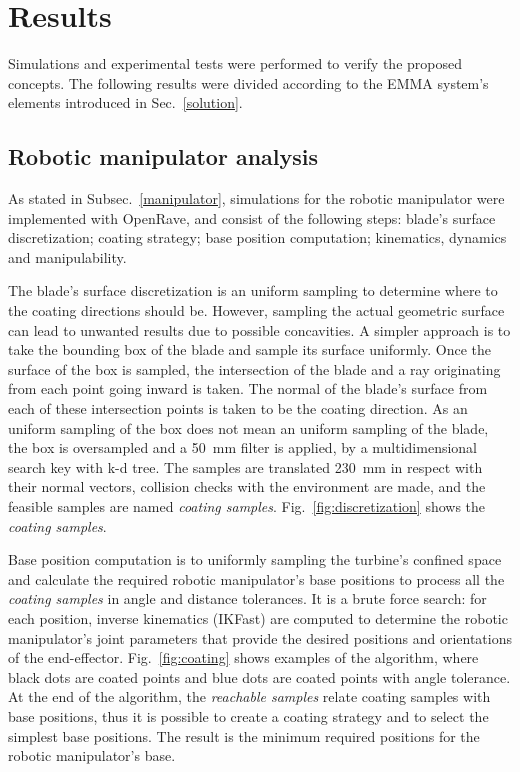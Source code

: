 \section{Results}



Simulations and experimental tests were performed to verify the proposed
concepts. The following results were divided according to the EMMA system's
elements introduced in Sec.~\ref{solution}. 


\subsection{Robotic manipulator analysis}\label{sec::man_analysis}

As stated in Subsec.~\ref{manipulator}, simulations for the robotic
manipulator were implemented with OpenRave, and consist of the following steps:
blade's surface discretization; coating strategy; base position computation;
kinematics, dynamics and manipulability.

The blade's surface discretization is an uniform sampling to
determine where to the coating directions should be. However, sampling the
actual geometric surface can lead to unwanted results due to possible
concavities. A simpler approach is to take the bounding box of the blade and
sample its surface uniformly. Once the
surface of the box is sampled, the intersection of the blade and a ray
originating from each point going inward is taken. The normal of the blade's
surface from each of these intersection points is taken to be the coating
direction. As an uniform sampling of the box does not mean an uniform sampling
of the blade, the box is oversampled and a 50~mm filter is applied, by a multidimensional search key with k-d tree.
The samples are translated 230~mm in respect with their normal vectors,
collision checks with the environment are made, and the feasible samples are
named \textit{coating samples}. Fig.~\ref{fig:discretization} shows the
\textit{coating samples}. 

Base position computation is to uniformly sampling the turbine's
confined space and calculate the required robotic manipulator's base positions
to process all the \textit{coating samples} in angle and distance tolerances.
It is a brute force search: for each position, inverse kinematics (IKFast) are
computed to determine the robotic manipulator's joint parameters that provide
the desired positions and orientations of the end-effector.
Fig.~\ref{fig:coating} shows examples of the algorithm, where black dots are
coated points and blue dots are coated points with angle tolerance. At the end
of the algorithm, the \textit{reachable samples} relate coating samples with base
positions, thus it is possible to create a coating strategy and to select the
simplest base positions. The result is the minimum required positions for the
robotic manipulator's base.

